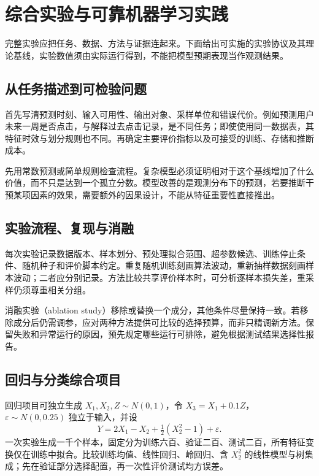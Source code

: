 \setcounter{chapter}{24} %
\chapter{综合实验与可靠机器学习实践}
\label{chap:ml-practice}

完整实验应把任务、数据、方法与证据连起来。下面给出可实施的实验协议及其理论基线，实验数值须由实际运行得到，不能把模型预期表现当作观测结果。

\section{从任务描述到可检验问题}

首先写清预测时刻、输入可用性、输出对象、采样单位和错误代价。例如预测用户未来一周是否点击，与解释过去点击记录，是不同任务；即使使用同一数据表，其特征时效与划分规则也不同。再确定主要评价指标以及可接受的训练、存储和推断成本。

先用常数预测或简单规则检查流程。复杂模型必须证明相对于这个基线增加了什么价值，而不只是达到一个孤立分数。模型改善的是观测分布下的预测，若要推断干预某项因素的效果，需要额外的因果设计，不能从特征重要性直接推出。

\section{实验流程、复现与消融}

每次实验记录数据版本、样本划分、预处理拟合范围、超参数候选、训练停止条件、随机种子和评价脚本约定。重复随机训练刻画算法波动，重新抽样数据刻画样本波动；二者应分别记录。方法比较共享评价样本时，可分析逐样本损失差，重采样仍须尊重相关分组。

消融实验（ablation study）移除或替换一个成分，其他条件尽量保持一致。若移除成分后仍需调参，应对两种方法提供可比较的选择预算，而非只精调新方法。保留失败和异常运行的原因，预先规定哪些运行可排除，避免根据测试结果选择性报告。

\section{回归与分类综合项目}

回归项目可独立生成 $X_1,X_2,Z\sim N(0,1)$，令 $X_3=X_1+0.1Z$，$\varepsilon\sim N(0,0.25)$ 独立于输入，并设
\begin{equation}
 Y=2X_1-X_2+\tfrac12(X_2^2-1)+\varepsilon.
 \label{eq:ml-regression-project}
\end{equation}
一次实验生成一千个样本，固定分为训练六百、验证二百、测试二百，所有特征变换仅在训练中拟合。比较训练均值、线性回归、岭回归、含 $X_2^2$ 的线性模型与树集成；先在验证部分选择配置，再一次性评价测试均方误差。

